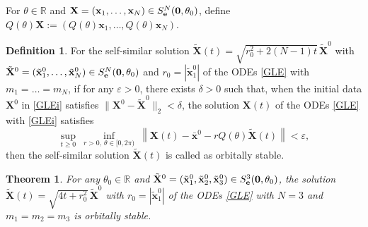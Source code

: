 \documentclass{aims}
\theoremstyle{plain}
\newtheorem{theorem}{Theorem}[section]
\theoremstyle{definition}
\newtheorem{definition}{Definition}[section]
\newcommand{\bx}{{\mathbf x}}
\newcommand{\bX}{{\mathbf X}}
\newcommand{\be} {\begin{equation}}
\begin{document}
For $\theta\in {\mathbb R}$ and
$\bX=(\bx_1,\ldots,\bx_N) \in S_{{\bf e}}^N({\bf 0},\theta_0)$, define
$Q(\theta)\bX:=(Q(\theta)\bx_1,\ldots,Q(\theta)\bx_N)$.

\begin{definition}
For the self-similar solution $\tilde \bX(t)=\sqrt{r_0^2+2(N-1)t}\,\tilde\bX^0$ with
$\tilde\bX^0=(\tilde\bx_1^0,\ldots,\tilde\bx_N^0)\in S_{{\bf e}}^N({\bf 0},\theta_0)$ and
$r_0=|\tilde \bx_1^0|$ of the ODEs \eqref{GLE} with $m_1=\ldots=m_N$,
if for any $\varepsilon>0$, there exists $\delta>0$ such that,
when the initial data $\bX^0$ in \eqref{GLEi} satisfies $\|\bX^0- \tilde\bX^0\|_2<\delta$, the solution $\bX(t)$ of the ODEs \eqref{GLE}
with \eqref{GLEi} satisfies
\be%
\sup_{t\geq 0}\ \inf_{r>0,\ \theta\in[0,2\pi)}\ \left\|\bX(t)-\bar{\bx}^0 -r Q(\theta)\tilde \bX(t)\right\|<\varepsilon,\nonumber
\end{equation}
then  the self-similar solution $\tilde \bX(t)$ is called as
orbitally stable.
\end{definition}

\begin{theorem}
For any $\theta_0\in {\mathbb R}$ and $\tilde\bX^0=(\tilde\bx_1^0,\tilde\bx_2^0,\tilde\bx_3^0)\in S_{{\bf e}}^3({\bf 0},\theta_0)$, the solution $\tilde{\mathbf X}(t)=\sqrt{4t+r_0^2}\,
\tilde{\mathbf X}^0$ with $r_0=|\tilde \bx_1^0|$ of the ODEs \eqref{GLE}
with $N=3$ and $m_1=m_2=m_3$ is orbitally stable.
\end{theorem}
\end{document}

